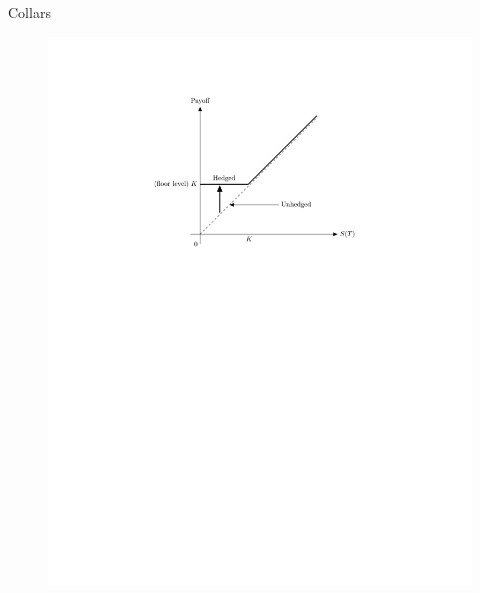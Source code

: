 \documentclass[10pt,handout]{beamer}
\theoremstyle{definition}
\begin{document}
\begin{frame}{Collars}
\begin{figure}[!htbp]
    \includegraphics[scale=0.7,page=10]{fig/note08/lo.pdf}
  \end{figure}
\end{frame}
\end{document}
